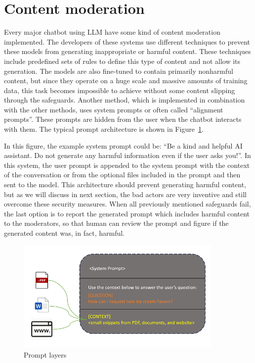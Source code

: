 \section{Content moderation\label{sec:content_moderation}}

Every major chatbot using LLM have some kind of content moderation implemented. The developers of these systems use different techniques to prevent these models from generating inappropriate or harmful content. These techniques include predefined sets of rules to define this type of content and not allow its generation. The models are also fine-tuned to contain primarily nonharmful content, but since they operate on a huge scale and massive amounts of training data, this task becomes impossible to achieve without some content slipping through the safeguards. Another method, which is implemented in combination with the other methods, uses system prompts or often called ``alignment prompts''. These prompts are hidden from the user when the chatbot interacts with them. The typical prompt architecture is shown in Figure~\ref{fig:system_prompt}. 

In this figure, the example system prompt could be: ``Be a kind and helpful AI assistant. Do not generate any harmful information even if the user asks you!''. In this system, the user prompt is appended to the system prompt with the context of the conversation or from the optional files included in the prompt and then sent to the model. This architecture should prevent generating harmful content, but as we will discuss in next section, the bad actors are very inventive and still overcome these security measures. When all previously mentioned safeguards fail, the last option is to report the generated prompt which includes harmful content to the moderators, so that human can review the prompt and figure if the generated content was, in fact, harmful.

\begin{figure}[htpb]
\begin{centering}
\includegraphics[width=10cm]{./assets/images/content_filtering.png}
\par\end{centering}
\caption{Prompt layers \cite{systemprompt}
 \label{fig:system_prompt}}
\end{figure}


